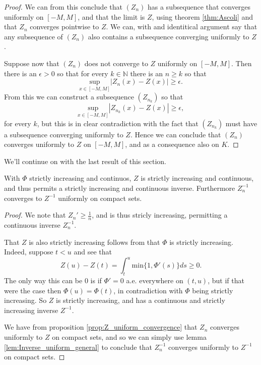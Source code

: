 \documentclass[11pt, a4paper]{article}
\begin{document}
\begin{appendix}
\begin{proof}
We can from this conclude that $(Z_n)$ has a subsequence that converges uniformly on $[-M,M]$, and that the limit is $Z$, using theorem \ref{thm:Ascoli} and that $Z_n$ converges pointwise to $Z$. We can, with and identitical argument say that any subsequence of $(Z_n)$ also contains a subsequence converging uniformly to $Z$.

Suppose now that $(Z_n)$ does not converge to $Z$ uniformly on $[-M,M]$. Then there is an $\epsilon > 0$ so that for every $k \in \mathbb{N}$ there is an $n \geq k$ so that
\begin{equation*}
\underset{x\in[-M,M]}{\mathrm{sup}}|Z_n(x) - Z(x)| \geq \epsilon.
\end{equation*}
From this we can construct a subsequence $(Z_{n_k})$ so that
\begin{equation*}
\underset{x\in[-M,M]}{\mathrm{sup}}|Z_{n_k}(x) - Z(x)| \geq \epsilon,
\end{equation*}
for every $k$, but this is in clear contradiction with the fact that $(Z_{n_k})$ must have a subsequence converging uniformly to $Z$. Hence we can conclude that $(Z_n)$ converges uniformly to $Z$ on $[-M,M]$, and as a consequence also on $K$.
\end{proof}

We'll continue on with the last result of this section.
\begin{proposition}
\label{prop:Zinv_uniform_convergence}
With $\Phi$ strictly increasing and continuos, $Z$ is strictly increasing and continuous, and thus permits a strictly increasing and continuous inverse. Furthermore $Z_n^{-1}$ converges to $Z^{-1}$ uniformly on compact sets.
\end{proposition}
\begin{proof}
 We note that $Z_n' \geq \frac{1}{n}$, and is thus stricly increasing, permitting a continuous inverse $Z_n^{-1}$. 

That $Z$ is also strictly increasing follows from that $\Phi$ is strictly increasing. Indeed, suppose $t<u$ and see that
\begin{equation*}
Z(u) - Z(t) = \int_t^u \mathrm{min}\{1,\Phi'(s)\}ds \geq 0.
\end{equation*}
The only way this can be $0$ is if $\Phi' = 0$ a.e. everywhere on $(t,u)$, but if that were the case then $\Phi(u) = \Phi(t)$, in contradiction with $\Phi$ being strictly increasing. So $Z$ is strictly increasing, and has a continuous and strictly increasing inverse $Z^{-1}$.

We have from proposition \ref{prop:Z_uniform_convergence} that $Z_n$ converges uniformly to $Z$ on compact sets, and so we can simply use lemma \ref{lem:Inverse_uniform_general} to conclude that $Z_n^{-1}$ converges uniformly to $Z^{-1}$ on compact sets.
\end{proof}

\end{appendix}
\end{document}
